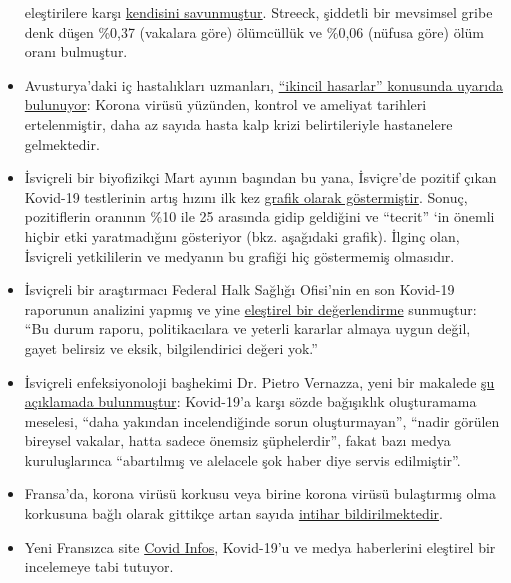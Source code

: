 \begin{itemize}
  eleştirilere karşı
  \href{https://www.tagesspiegel.de/wissen/virologe-streeck-zur-coronavirus-studie-die-veroeffentlichung-zu-heinsberg-war-nicht-leichtfertig/25735672.html}{kendisini
  savunmuştur}. Streeck, şiddetli bir mevsimsel gribe denk düşen \%0,37
  (vakalara göre) ölümcüllük ve \%0,06 (nüfusa göre) ölüm oranı
  bulmuştur.
\item
  Avusturya'daki iç hastalıkları uzmanları,
  \href{https://wien.orf.at/stories/3044064}{``ikincil hasarlar''
  konusunda uyarıda bulunuyor}: Korona virüsü yüzünden, kontrol ve
  ameliyat tarihleri ertelenmiştir, daha az sayıda hasta kalp krizi
  belirtileriyle hastanelere gelmektedir.
\item
  İsviçreli bir biyofizikçi Mart ayının başından bu yana, İsviçre'de
  pozitif çıkan Kovid-19 testlerinin artış hızını ilk kez
  \href{https://swprs.org/rate-of-positive-covid19-tests/}{grafik olarak
  göstermiştir}. Sonuç, pozitiflerin oranının \%10 ile 25 arasında gidip
  geldiğini ve ``tecrit'' `in önemli hiçbir etki yaratmadığını
  gösteriyor (bkz. aşağıdaki grafik). İlginç olan, İsviçreli
  yetkililerin ve medyanın bu grafiği hiç göstermemiş olmasıdır.
\item
  İsviçreli bir araştırmacı Federal Halk Sağlığı Ofisi'nin en son
  Kovid-19 raporunun analizini yapmış ve yine
  \href{https://covid-19-fakten.blogspot.com/2020/04/der-bag-situationsbericht-vom-1442020.html}{eleştirel
  bir değerlendirme} sunmuştur: ``Bu durum raporu, politikacılara ve
  yeterli kararlar almaya uygun değil, gayet belirsiz ve eksik,
  bilgilendirici değeri yok.''
\item
  İsviçreli enfeksiyonoloji başhekimi Dr. Pietro Vernazza, yeni bir
  makalede
  \href{https://infekt.ch/2020/04/hinterlaesst-coronavirus-eine-immunitaet/}{şu
  açıklamada bulunmuştur}: Kovid-19'a karşı sözde bağışıklık
  oluşturamama meselesi, ``daha yakından incelendiğinde sorun
  oluşturmayan'', ``nadir görülen bireysel vakalar, hatta sadece önemsiz
  şüphelerdir'', fakat bazı medya kuruluşlarınca ``abartılmış ve
  alelacele şok haber diye servis edilmiştir''.
\item
  Fransa'da, korona virüsü korkusu veya birine korona virüsü bulaştırmış
  olma korkusuna bağlı olarak gittikçe artan sayıda
  \href{https://www.midilibre.fr/2020/04/09/coronavirus-ces-suicides-de-malades-ou-de-personnes-tenaillees-par-langoisse,8839373.php}{intihar
  bildirilmektedir}.
\item
  Yeni Fransızca site \href{https://covidinfos.net/}{Covid Infos},
  Kovid-19'u ve medya haberlerini eleştirel bir incelemeye tabi tutuyor.
\end{itemize}

